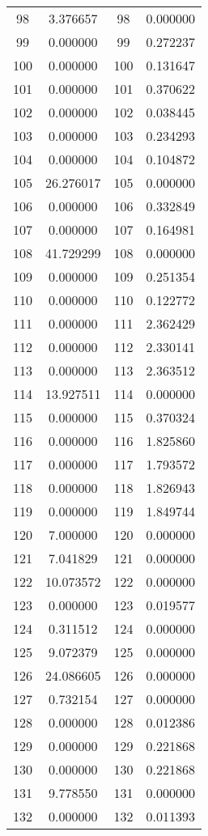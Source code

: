 \documentclass[12pt]{article}
\begin{document}
\begin{longtable}{@{}cccc@{}}
98 & 3.376657 & 98 & 0.000000 \\
99 & 0.000000 & 99 & 0.272237 \\
100 & 0.000000 & 100 & 0.131647 \\
101 & 0.000000 & 101 & 0.370622 \\
102 & 0.000000 & 102 & 0.038445 \\
103 & 0.000000 & 103 & 0.234293 \\
104 & 0.000000 & 104 & 0.104872 \\
105 & 26.276017 & 105 & 0.000000 \\
106 & 0.000000 & 106 & 0.332849 \\
107 & 0.000000 & 107 & 0.164981 \\
108 & 41.729299 & 108 & 0.000000 \\
109 & 0.000000 & 109 & 0.251354 \\
110 & 0.000000 & 110 & 0.122772 \\
111 & 0.000000 & 111 & 2.362429 \\
112 & 0.000000 & 112 & 2.330141 \\
113 & 0.000000 & 113 & 2.363512 \\
114 & 13.927511 & 114 & 0.000000 \\
115 & 0.000000 & 115 & 0.370324 \\
116 & 0.000000 & 116 & 1.825860 \\
117 & 0.000000 & 117 & 1.793572 \\
118 & 0.000000 & 118 & 1.826943 \\
119 & 0.000000 & 119 & 1.849744 \\
120 & 7.000000 & 120 & 0.000000 \\
121 & 7.041829 & 121 & 0.000000 \\
122 & 10.073572 & 122 & 0.000000 \\
123 & 0.000000 & 123 & 0.019577 \\
124 & 0.311512 & 124 & 0.000000 \\
125 & 9.072379 & 125 & 0.000000 \\
126 & 24.086605 & 126 & 0.000000 \\
127 & 0.732154 & 127 & 0.000000 \\
128 & 0.000000 & 128 & 0.012386 \\
129 & 0.000000 & 129 & 0.221868 \\
130 & 0.000000 & 130 & 0.221868 \\
131 & 9.778550 & 131 & 0.000000 \\
132 & 0.000000 & 132 & 0.011393 \\

\end{longtable}
\end{document}
